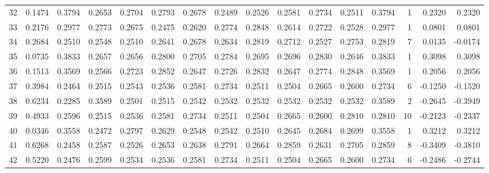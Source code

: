 \begin{tabular}{lrrrrrrrrrrrrrrr}
32  &      0.1474 &  0.3794 &  0.2653 &  0.2704 &  0.2793 &  0.2678 &  0.2489 &  0.2526 &  0.2581 &  0.2734 &   0.2511 &     0.3794 &      1 &                    0.2320 &                     0.2320 \\
33  &      0.2176 &  0.2977 &  0.2773 &  0.2675 &  0.2475 &  0.2620 &  0.2774 &  0.2848 &  0.2614 &  0.2722 &   0.2528 &     0.2977 &      1 &                    0.0801 &                     0.0801 \\
34  &      0.2684 &  0.2510 &  0.2548 &  0.2510 &  0.2641 &  0.2678 &  0.2634 &  0.2819 &  0.2712 &  0.2527 &   0.2753 &     0.2819 &      7 &                    0.0135 &                    -0.0174 \\
35  &      0.0735 &  0.3833 &  0.2657 &  0.2656 &  0.2800 &  0.2705 &  0.2784 &  0.2695 &  0.2696 &  0.2830 &   0.2646 &     0.3833 &      1 &                    0.3098 &                     0.3098 \\
36  &      0.1513 &  0.3569 &  0.2566 &  0.2723 &  0.2852 &  0.2647 &  0.2726 &  0.2832 &  0.2647 &  0.2774 &   0.2848 &     0.3569 &      1 &                    0.2056 &                     0.2056 \\
37  &      0.3984 &  0.2464 &  0.2515 &  0.2543 &  0.2536 &  0.2581 &  0.2734 &  0.2511 &  0.2504 &  0.2665 &   0.2600 &     0.2734 &      6 &                   -0.1250 &                    -0.1520 \\
38  &      0.6234 &  0.2285 &  0.3589 &  0.2501 &  0.2515 &  0.2542 &  0.2532 &  0.2532 &  0.2532 &  0.2532 &   0.2532 &     0.3589 &      2 &                   -0.2645 &                    -0.3949 \\
39  &      0.4933 &  0.2596 &  0.2515 &  0.2536 &  0.2581 &  0.2734 &  0.2511 &  0.2504 &  0.2665 &  0.2600 &   0.2810 &     0.2810 &     10 &                   -0.2123 &                    -0.2337 \\
40  &      0.0346 &  0.3558 &  0.2472 &  0.2797 &  0.2629 &  0.2548 &  0.2542 &  0.2510 &  0.2645 &  0.2684 &   0.2699 &     0.3558 &      1 &                    0.3212 &                     0.3212 \\
41  &      0.6268 &  0.2458 &  0.2587 &  0.2526 &  0.2653 &  0.2638 &  0.2791 &  0.2664 &  0.2859 &  0.2631 &   0.2705 &     0.2859 &      8 &                   -0.3409 &                    -0.3810 \\
42  &      0.5220 &  0.2476 &  0.2599 &  0.2534 &  0.2536 &  0.2581 &  0.2734 &  0.2511 &  0.2504 &  0.2665 &   0.2600 &     0.2734 &      6 &                   -0.2486 &                    -0.2744 \\

\end{tabular}
